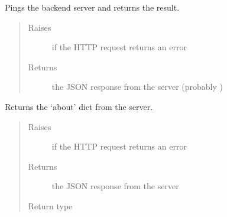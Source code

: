 \documentclass[letterpaper,10pt,english]{sphinxmanual}
\begin{document}
\begin{fulllineitems}
\begin{fulllineitems}
\label{\detokenize{autoapi/pine/client/index:pine.client.PineClient.ping}}
Pings the backend server and returns the result.
\begin{quote}\begin{description}
\item[{Raises}] \leavevmode
{\hyperref[\detokenize{autoapi/pine/client/exceptions/index:pine.client.exceptions.PineClientHttpException}]{}} \textendash{} if the HTTP request returns an error

\item[{Returns}] \leavevmode
the JSON response from the server (probably )

\end{description}\end{quote}

\end{fulllineitems}


\begin{fulllineitems}
\label{\detokenize{autoapi/pine/client/index:pine.client.PineClient.about}}
Returns the ‘about’ dict from the server.
\begin{quote}\begin{description}
\item[{Raises}] \leavevmode
{\hyperref[\detokenize{autoapi/pine/client/exceptions/index:pine.client.exceptions.PineClientHttpException}]{}} \textendash{} if the HTTP request returns an error

\item[{Returns}] \leavevmode
the JSON response from the server

\item[{Return type}] \leavevmode
{}

\end{description}\end{quote}

\end{fulllineitems}


\end{fulllineitems}
\end{document}
